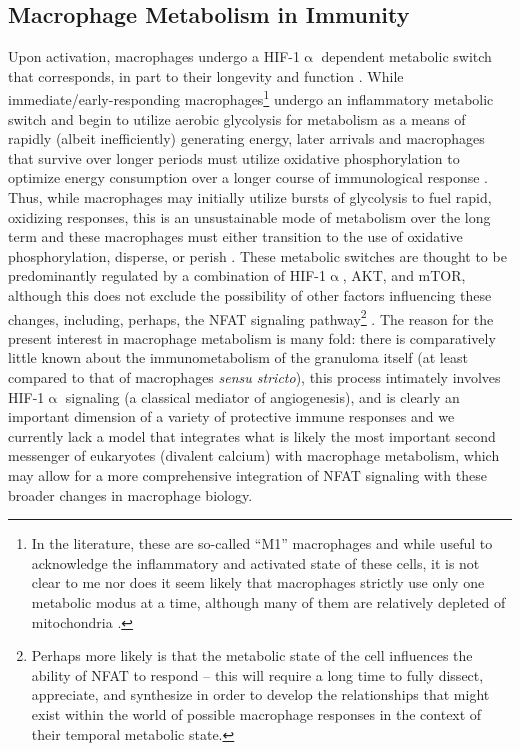 \subsection{Macrophage Metabolism in Immunity}\label{metabolism}

Upon activation, macrophages undergo a HIF\hyp{}1$\upalpha$ dependent metabolic switch that corresponds, in part to their longevity and function \citep{Kolliniati2022}. While immediate/early\hyp{}responding macrophages\footnote{In the literature, these are so\hyp{}called ``M1'' macrophages and while useful to acknowledge the inflammatory and activated state of these cells, it is not clear to me nor does it seem likely that macrophages strictly use only one metabolic modus at a time, although many of them are relatively depleted of mitochondria \citep{Biswas2012}.} undergo an inflammatory metabolic switch and begin to utilize aerobic glycolysis for metabolism as a means of rapidly (albeit inefficiently) generating energy, later arrivals and macrophages that survive over longer periods must utilize oxidative phosphorylation to optimize energy consumption over a longer course of immunological response \citep{Shi2019, Kiran2016, Viola2019, Langston2017, Taylor2022}. Thus, while macrophages may initially utilize  bursts of glycolysis to fuel rapid, oxidizing responses, this is an unsustainable mode of metabolism over the long term and these macrophages must either transition to the use of oxidative phosphorylation, disperse, or perish \citep{Odegaard2011, Howard2020}. These metabolic switches are thought to be predominantly regulated by a combination of HIF\hyp{}1$\upalpha$, AKT, and mTOR, although this does not exclude the possibility of other factors influencing these changes, including, perhaps, the NFAT signaling pathway\footnote{Perhaps more likely is that the metabolic state of the cell influences the ability of NFAT to respond -- this will require a long time to fully dissect, appreciate, and synthesize in order to develop the relationships that might exist within the world of possible macrophage responses in the context of their temporal metabolic state.} \citep{Covarrubias2015, Karar2011}. The reason for the present interest in macrophage metabolism is many fold: there is comparatively little known about the immunometabolism of the granuloma itself (at least compared to that of macrophages \textit{sensu stricto}), this process intimately involves HIF\hyp{}1$\upalpha$ signaling (a classical mediator of angiogenesis), and is clearly an important dimension of a variety of protective immune responses and we currently lack a model that integrates what is likely the most important second messenger of eukaryotes (divalent calcium) with macrophage metabolism, which may allow for a more comprehensive integration of NFAT signaling with these broader changes in macrophage biology. 

